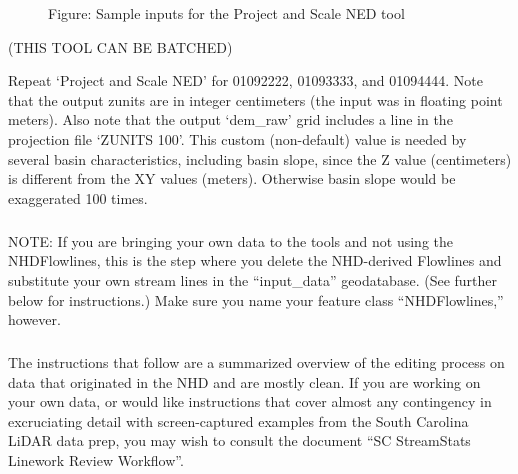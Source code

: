 \documentclass[letterpaper,10pt,english]{sphinxmanual}
\begin{document}
\begin{figure}[htbp]
\centering
\capstart

\noindent{}
\caption{Figure: Sample inputs for the Project and Scale NED tool}\label{\detokenize{ex_1:id12}}\end{figure}

(THIS TOOL CAN BE BATCHED)

Repeat ‘Project and Scale NED’ for 01092222, 01093333, and 01094444.  Note that the output zunits are in integer centimeters (the input was in floating point meters). Also note that the output ‘dem\_raw’ grid includes a line in the projection file ‘ZUNITS 100’.  This custom (non-default) value is needed by several basin characteristics, including basin slope, since the Z value (centimeters) is different from the XY values (meters).  Otherwise basin slope would be exaggerated 100 times.


\paragraph{}
\label{\detokenize{ex_1:step-3-editing-nhd}}

\subparagraph{}
\label{\detokenize{ex_1:preliminary-notes}}

\subparagraph{}
\label{\detokenize{ex_1:note-about-byod}}
NOTE: If you are bringing your own data to the tools and not using the NHDFlowlines, this is the step where you delete the NHD-derived Flowlines and substitute your own stream lines in the “input\_data” geodatabase. (See further below for instructions.) Make sure you name your feature class “NHDFlowlines,” however.


\subparagraph{}
\label{\detokenize{ex_1:note-about-editing-instructions}}
The instructions that follow are a summarized overview of the editing process on data that originated in the NHD and are mostly clean. If you are working on your own data, or would like instructions that cover almost any contingency in excruciating detail with screen-captured examples from the South Carolina LiDAR data prep, you may wish to consult the document “SC StreamStats Linework Review Workflow”.
\end{document}

